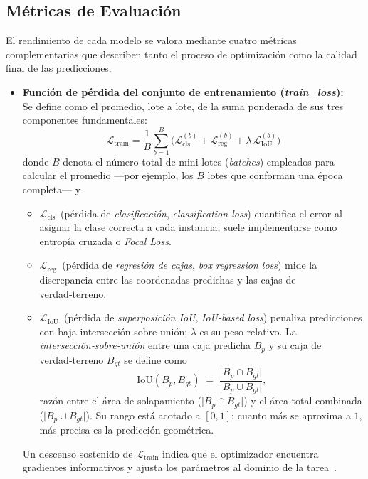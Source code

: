 \subsection{Métricas de Evaluación}

El rendimiento de cada modelo se valora mediante cuatro métricas complementarias que describen tanto el proceso de optimización como la calidad final de las predicciones.

\begin{itemize}
    \item \textbf{Función de pérdida del conjunto de entrenamiento (\emph{train\_loss}):}\\[2pt]
      Se define como el promedio, lote a lote, de la suma ponderada de sus tres componentes fundamentales:
      \[
      \mathcal{L}_{\text{train}}
      =\frac{1}{B}\sum_{b=1}^{B}
        \bigl(
          \mathcal{L}_{\text{cls}}^{(b)}
          +\mathcal{L}_{\text{reg}}^{(b)}
          +\lambda\,\mathcal{L}_{\text{IoU}}^{(b)}
        \bigr)
      \]
      donde $B$ denota el número total de mini‑lotes (\emph{batches}) empleados para calcular el promedio
      —por ejemplo, los $B$ lotes que conforman una época completa— y
      \begin{itemize}
        \item $\mathcal{L}_{\text{cls}}$ \,(pérdida de \textit{clasificación}, \emph{classification loss}) cuantifica el error al asignar la clase correcta a cada instancia; suele implementarse como entropía cruzada o \emph{Focal Loss}.
        \item $\mathcal{L}_{\text{reg}}$ \,(pérdida de \textit{regresión de cajas}, \emph{box regression loss}) mide la discrepancia entre las coordenadas predichas y las cajas de verdad‑terreno.
        \item $\mathcal{L}_{\text{IoU}}$ \,(pérdida de \textit{superposición IoU}, \emph{IoU‑based loss}) penaliza predicciones con baja intersección‑sobre‑unión; $\lambda$ es su peso relativo.
              La \emph{intersección‑sobre‑unión} entre una caja predicha $B_{p}$ y su caja de verdad‑terreno $B_{gt}$ se define como
              \[
                \mathrm{IoU}(B_{p},B_{gt})
                \;=\;
                \frac{\lvert B_{p}\cap B_{gt}\rvert}{\lvert B_{p}\cup B_{gt}\rvert},
              \]
              razón entre el área de solapamiento (\(\lvert B_{p}\cap B_{gt}\rvert\)) y el área total combinada (\(\lvert B_{p}\cup B_{gt}\rvert\)).
              Su rango está acotado a \([0,1]\): cuanto más se aproxima a \(1\), más precisa es la predicción geométrica.
      \end{itemize}
      Un descenso sostenido de $\mathcal{L}_{\text{train}}$ indica que el optimizador encuentra gradientes informativos y ajusta los parámetros al dominio de la tarea~\cite{goodfellow2016deep}.


\end{itemize}
